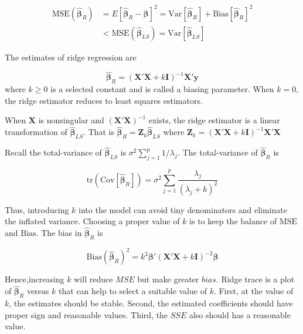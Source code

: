 \documentclass[
  11pt,
  openany]{memoir}
\begin{document}
\begin{equation}
\begin{split}
\mathrm{MSE}(\boldsymbol{\hat\beta}_{R})&=E[\boldsymbol{\hat\beta}_{R}-\boldsymbol{\beta}]^2=\mathrm{Var}[\boldsymbol{\hat\beta}_{R}]+\mathrm{Bias}[\boldsymbol{\hat\beta}_{R}]^2\\
&<\mathrm{MSE}(\boldsymbol{\hat\beta}_{LS})=\mathrm{Var}[\boldsymbol{\hat\beta}_{LS}]
\end{split}
\end{equation}

The estimates of ridge regression are

\begin{equation}
\boldsymbol{\hat\beta}_{R}=(\mathbf{X'X}+k\mathbf{I})^{-1}\mathbf{X'}\mathbf{y}
\label{eq:ridge-e}
\end{equation}
where \(k\ge0\) is a selected constant and is called a biasing parameter. When \(k=0\), the ridge estimator reduces to least squares estimators.

When \(\mathbf{X}\) is nonsingular and \((\mathbf{X'X})^{-1}\) exists, the ridge estimator is a linear transformation of \(\boldsymbol{\hat\beta}_{LS}\). That is \(\boldsymbol{\hat\beta}_{R}=\mathbf{Z}_k\boldsymbol{\hat\beta}_{LS}\) where \(\mathbf{Z}_k=(\mathbf{X'X}+k\mathbf{I})^{-1}\mathbf{X'X}\)

Recall the total-variance of \(\boldsymbol{\hat\beta}_{LS}\) is \(\sigma^2\sum_{j=1}^p1/\lambda_j\).
The total-variance of \(\boldsymbol{\hat\beta}_{R}\) is

\begin{equation}
\mathrm{tr}(\mathrm{Cov}[\boldsymbol{\hat\beta}_{R}])=\sigma^2\sum_{j=1}^p\frac{\lambda_j}{(\lambda_j+k)^2}
\end{equation}

Thus, introducing \(k\) into the model can avoid tiny denominators and eliminate the inflated variance.
Choosing a proper value of \(k\) is to keep the balance of \(\mathrm{MSE}\) and \(\mathrm{Bias}\).
The bias in \(\boldsymbol{\hat\beta}_{R}\) is

\begin{equation}
\mathrm{Bias}(\boldsymbol{\hat\beta}_{R})^2=k^2\boldsymbol{\beta}'(\mathbf{X'X}+k\mathbf{I})^{-2}\boldsymbol{\beta}
\end{equation}

Hence,increasing \(k\) will reduce \(MSE\) but make greater \(bias\).
Ridge trace is a plot of \(\boldsymbol{\hat\beta}_{R}\) versus \(k\) that can help to select a suitable value of \(k\).
First, at the value of \(k\), the estimates should be stable. Second, the estimated coefficients should have proper sign and reasonable values. Third, the \(SSE\) also should has a reasonable value.
\end{document}
